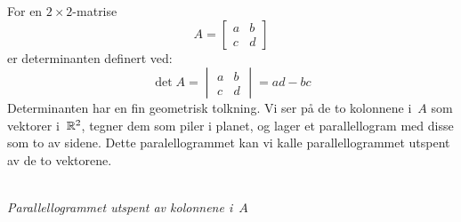 For en $2 \times 2$-matrise
\[
A =
\begin{bmatrix}
a & b \\
c & d
\end{bmatrix}
\]
er determinanten definert ved:
\[
\det A =
\begin{vmatrix}
a & b \\
c & d
\end{vmatrix}
= ad - bc
\]
Determinanten har en fin geometrisk tolkning.  Vi ser på de to
kolonnene i~$A$ som vektorer i~$\mathbb{R}^2$, tegner dem som piler i planet,
og lager et parallellogram med disse som to av sidene.  Dette
paralellogrammet kan vi kalle parallellogrammet utspent av de to
vektorene.
\begin{center}
\\
{\small \textit{Parallellogrammet utspent av kolonnene i~$A$}}
\end{center}

